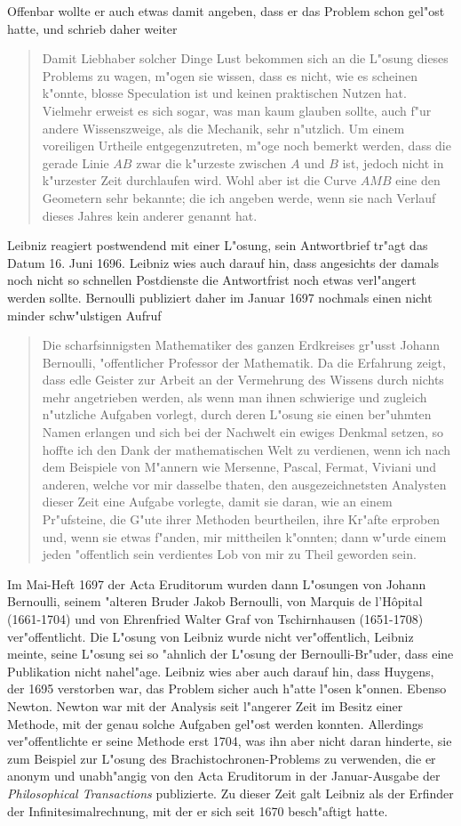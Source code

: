 Offenbar wollte er auch etwas damit angeben, dass er das Problem
schon gel"ost hatte, und schrieb daher weiter
\begin{quote}
Damit Liebhaber solcher Dinge Lust bekommen sich an die L"osung
dieses Problems zu wagen, m"ogen sie wissen, dass es nicht, wie es
scheinen k"onnte, blosse Speculation ist und keinen praktischen
Nutzen hat. Vielmehr erweist es sich sogar, was man kaum glauben
sollte, auch f"ur andere Wissenszweige, als die Mechanik, sehr
n"utzlich. Um einem voreiligen Urtheile entgegenzutreten, m"oge noch
bemerkt werden, dass die gerade Linie $AB$ zwar die k"urzeste zwischen
$A$ und $B$ ist, jedoch nicht in k"urzester Zeit durchlaufen wird. Wohl
aber ist die Curve $AMB$ eine den Geometern sehr bekannte; die ich
angeben werde, wenn sie nach Verlauf dieses Jahres kein anderer
genannt hat.
\end{quote}
Leibniz reagiert postwendend mit einer L"osung, sein Antwortbrief tr"agt
das Datum 16. Juni 1696. Leibniz wies auch darauf hin, dass angesichts
der damals noch nicht so schnellen Postdienste die Antwortfrist noch
etwas verl"angert werden sollte.
Bernoulli publiziert daher im Januar 1697 nochmals einen nicht
minder schw"ulstigen Aufruf
\begin{quote}
Die scharfsinnigsten Mathematiker des ganzen Erdkreises gr"usst
Johann Bernoulli, "offentlicher Professor der Mathematik.
Da die Erfahrung zeigt, dass edle Geister zur Arbeit an der Vermehrung
des Wissens durch nichts mehr angetrieben werden, als wenn man ihnen
schwierige und zugleich n"utzliche Aufgaben vorlegt, durch deren
L"osung sie einen ber"uhmten Namen erlangen und sich bei der Nachwelt
ein ewiges Denkmal setzen, so hoffte ich den Dank der mathematischen
Welt zu verdienen, wenn ich nach dem Beispiele von M"annern wie
Mersenne, Pascal, Fermat, Viviani und anderen, welche vor mir
dasselbe thaten, den ausgezeichnetsten Analysten dieser Zeit eine
Aufgabe vorlegte, damit sie daran, wie an einem Pr"ufsteine, die
G"ute ihrer Methoden beurtheilen, ihre Kr"afte erproben und, wenn sie
etwas f"anden, mir mittheilen k"onnten; dann w"urde einem jeden
"offentlich sein verdientes Lob von mir zu Theil geworden sein.
\end{quote}
Im Mai-Heft 1697 der Acta Eruditorum wurden dann L"osungen von
Johann Bernoulli, seinem "alteren Bruder Jakob Bernoulli, von Marquis
de l'H\^opital (1661-1704) und
von Ehrenfried Walter Graf von Tschirnhausen (1651-1708)
ver"offentlicht.
Die L"osung von Leibniz wurde nicht ver"offentlich, Leibniz
meinte, seine L"osung sei so "ahnlich der L"osung der Bernoulli-Br"uder,
dass eine Publikation nicht nahel"age. Leibniz wies aber auch darauf hin,
dass Huygens, der 1695 verstorben war, das Problem sicher auch h"atte l"osen
k"onnen. Ebenso Newton.
Newton war mit der Analysis seit l"angerer Zeit im Besitz einer Methode,
mit der genau solche Aufgaben gel"ost werden konnten.
Allerdings ver"offentlichte er seine Methode erst 1704, was ihn
aber nicht daran hinderte, sie zum Beispiel zur L"osung des
Brachistochronen-Problems zu verwenden, die er anonym und unabh"angig von
den Acta Eruditorum in der Januar-Ausgabe der {\it Philosophical Transactions}
publizierte.
Zu dieser Zeit galt Leibniz als der Erfinder der Infinitesimalrechnung,
mit der er sich seit 1670 besch"aftigt hatte.

